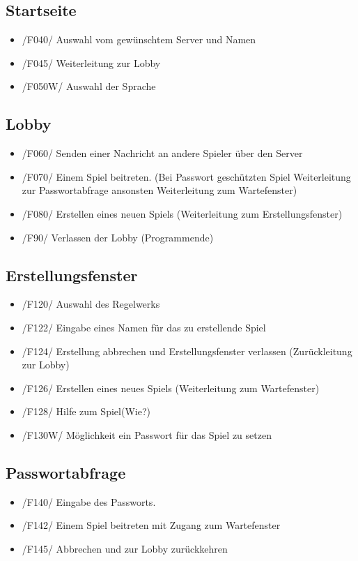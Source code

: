 \documentclass{article}
\begin{document}
\subsection{Startseite}
\begin{itemize}
	\item /F040/ Auswahl vom gewünschtem \gls{Server} und Namen
	\item /F045/ Weiterleitung zur \gls{Lobby}
	\item /F050W/ Auswahl der Sprache
\end{itemize}

\subsection{\gls{Lobby}}
\begin{itemize}
	\item /F060/ Senden einer Nachricht an andere Spieler über den \gls{Server}
	\item /F070/ Einem Spiel beitreten. (Bei Passwort geschützten Spiel Weiterleitung zur Passwortabfrage ansonsten Weiterleitung zum \gls{Wartefenster})
	\item /F080/ Erstellen eines neuen Spiels (Weiterleitung zum \gls{Erstellungsfenster})
	\item /F90/ Verlassen der \gls{Lobby} (Programmende)
\end{itemize}

\subsection{Erstellungsfenster}
\begin{itemize}
	\item /F120/ Auswahl des \gls{Regelwerk}s
	\item /F122/ Eingabe eines Namen für das zu erstellende Spiel
	\item /F124/ Erstellung abbrechen und \gls{Erstellungsfenster} verlassen (Zurückleitung zur Lobby)
	\item /F126/ Erstellen eines neues Spiels (Weiterleitung zum Wartefenster)
	\item /F128/ Hilfe zum Spiel(Wie?)
	\item /F130W/ Möglichkeit ein Passwort für das Spiel zu setzen
\end{itemize}

\subsection{Passwortabfrage}
\begin{itemize}
	\item /F140/ Eingabe des Passworts.
	\item /F142/ Einem Spiel beitreten mit Zugang zum \gls{Wartefenster}
	\item /F145/ Abbrechen und zur \gls{Lobby} zurückkehren
\end{itemize}
\end{document}
